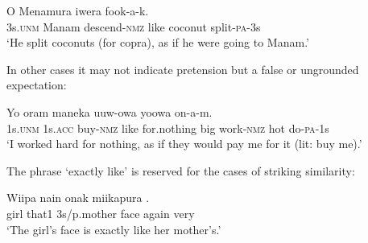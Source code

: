 \ea%
\label{ex:6:x1344}
\gll O  Menamura      iwera  fook-a-k. \\
3s.\textsc{unm}  Manam  descend-\textsc{nmz}  like  coconut  split-\textsc{pa}-3s\\
\glt `He split coconuts (for copra), as if he were going to Manam.'
\z

In other cases it may not indicate pretension but a false or ungrounded expectation: 

\ea%
\label{ex:6:x1345}
\gll Yo        oram  maneka uuw-owa  yoowa  on-a-m. \\
1s.\textsc{unm}  1s.\textsc{acc}  buy-\textsc{nmz}  like  for.nothing  big work-\textsc{nmz}  hot  do-\textsc{pa}-1s\\
\glt `I worked hard for nothing, as if they would pay me for it (lit: buy me).'
\z

The phrase   `exactly like' is reserved for the cases of striking similarity: 

\ea%
\label{ex:6:x1346}
\gll Wiipa  nain  onak  miikapura    . \\
girl  that1  3s/p.mother  face  again  very\\
\glt `The girl's face is exactly like her mother's.'
\z

